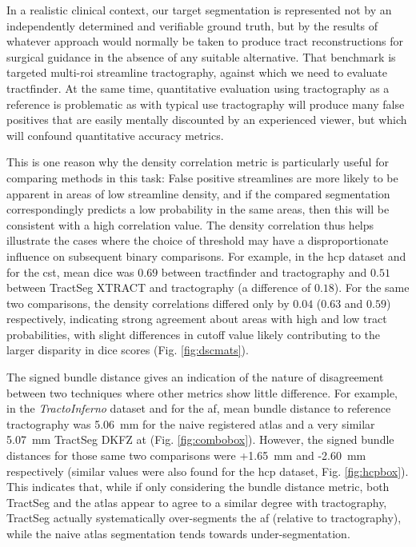 \documentclass[12pt,phd,a4paper,twoside]{ucl_thesis}
\begin{document}
In a realistic clinical context, our target segmentation is represented not by an independently determined and verifiable ground truth, but by the results of whatever approach would normally be taken to produce tract reconstructions for surgical guidance in the absence of any suitable alternative.
That benchmark is targeted multi-\gls{roi} streamline tractography, against which we need to evaluate tractfinder.
At the same time, quantitative evaluation using tractography as a reference is problematic as with typical use tractography will produce many false positives that are easily mentally discounted by an experienced viewer, but which will confound quantitative accuracy metrics.

This is one reason why the density correlation metric is particularly useful for comparing methods in this task:
False positive streamlines are more likely to be apparent in areas of low streamline density, and if the compared segmentation correspondingly predicts a low probability in the same areas, then this will be consistent with a high correlation value.
The density correlation thus helps illustrate the cases where the choice of threshold may have a disproportionate influence on subsequent binary comparisons.
For example, in the \gls{hcp} dataset and for the \gls{cst}, mean \gls{dice} was $0.69$ between tractfinder and tractography and $0.51$ between TractSeg XTRACT and tractography (a difference of $0.18$).
For the same two comparisons, the density correlations differed only by $0.04$ ($0.63$ and $0.59$) respectively, indicating strong agreement about areas with high and low tract probabilities, with slight differences in cutoff value likely contributing to the larger disparity in \gls{dice} scores (Fig. \ref{fig:dscmats}).

The signed bundle distance gives an indication of the nature of disagreement between two techniques where other metrics show little difference.
For example, in the \textit{TractoInferno} dataset and for the \gls{af}, mean bundle distance to reference tractography was 5.06~mm for the naive registered atlas and a very similar 5.07~mm TractSeg DKFZ at (Fig. \ref{fig:combobox}). However, the signed bundle distances for those same two comparisons were +1.65~mm and -2.60~mm respectively (similar values were also found for the \gls{hcp} dataset, Fig. \ref{fig:hcpbox}).
This indicates that, while if only considering the bundle distance metric, both TractSeg and the atlas appear to agree to a similar degree with tractography, TractSeg actually systematically over-segments the \gls{af} (relative to tractography), while the naive atlas segmentation tends towards under-segmentation.
\end{document}
